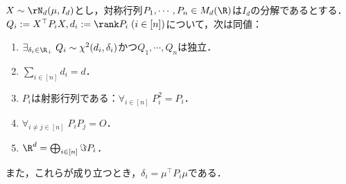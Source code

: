 \documentclass[uplatex,dvipdfmx]{jsarticle}
\begin{document}
\begin{theorem}\label{thm-Fisher-Cochran}
    $X\sim\rN_d(\mu,I_d)$とし，対称行列$P_1,\cdots,P_n\in M_d(\R)$は$I_d$の分解であるとする．
    $Q_i:=X^\top P_iX,d_i:=\rank P_i\;(i\in[n])$について，次は同値：
    \begin{enumerate}
        \item $\exists_{\delta_i\in\R_+}\;Q_i\sim\chi^2(d_i,\delta_i)$かつ$Q_1,\cdots,Q_n$は独立．
        \item $\sum_{i\in[n]}d_i=d$．
        \item $P_i$は射影行列である：$\forall_{i\in[n]}\;P_i^2=P_i$．
        \item $\forall_{i\ne j\in[n]}\;P_iP_j=O$．
        \item $\R^d=\bigoplus_{i\in[n]}\Im P_i$．
    \end{enumerate}
    また，これらが成り立つとき，$\delta_i=\mu^\top P_i\mu$である．
\end{theorem}
\end{document}
